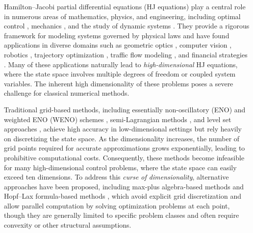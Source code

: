 \documentclass[review,hidelinks,onefignum,onetabnum]{siamart250106}
\begin{document}
Hamilton--Jacobi partial differential equations (HJ equations) play a central role in numerous areas of mathematics, physics, and engineering, including optimal control \cite{evans1984differential, sideris2005efficient, bansal2017hamilton}, mechanics \cite{denman1973solution, de2008linear}, and the study of dynamic systems \cite{khanin2010particle, rajeev2008hamilton}. They provide a rigorous framework for modeling systems governed by physical laws and have found applications in diverse domains such as geometric optics \cite{osher1993level, minano2006hamilton}, computer vision \cite{caselles1997geodesic, gilboa2009nonlocal, osher2007geometric}, robotics \cite{lin1998optimal, lewis2003robot, bansaL2020hamilton}, trajectory optimization \cite{delahaye2014mathematical, parzani2018hamilton}, traffic flow modeling \cite{imbert2013hamilton, lavaL2013hamilton}, and financial strategies \cite{forsyth2007numerical, cao2009optimal}. Many of these applications naturally lead to \emph{high-dimensional} HJ equations, where the state space involves multiple degrees of freedom or coupled system variables. The inherent high dimensionality of these problems poses a severe challenge for classical numerical methods.

Traditional grid-based methods, including essentially non-oscillatory (ENO) and weighted ENO (WENO) schemes \cite{osher1991high, jiang2000weighted, bryson2003high, qiu2005hermite}, semi-Lagrangian methods \cite{falcone2002semi, cristiani2007fast, falcone2013semi}, and level set approaches \cite{osher1988fronts, osher1993level, osher2004level, mitchell2004computing, ansari2013application}, achieve high accuracy in low-dimensional settings but rely heavily on discretizing the state space. As the dimensionality increases, the number of grid points required for accurate approximations grows exponentially, leading to prohibitive computational costs. Consequently, these methods become infeasible for many high-dimensional control problems, where the state space can easily exceed ten dimensions. 
 To address this \emph{curse of dimensionality}, alternative approaches have been proposed, including max-plus algebra-based methods \cite{mceneaney2006max, akian2008max, fleming2000max} and Hopf--Lax formula-based methods \cite{darbon2016algorithms, chow2017algorithm, chow2019algorithm, chen2024hopf}, which avoid explicit grid discretization and allow parallel computation by solving optimization problems at each point, though they are generally limited to specific problem classes and often require convexity or other structural assumptions.
 
\end{document}

